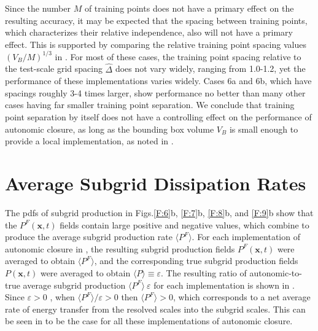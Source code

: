 Since the number $M$ of training points does not have a primary effect on the resulting accuracy, it may be expected that the spacing between training points, which characterizes their relative independence, also will not have a primary effect. This is supported by comparing the relative training point spacing values $(V_B/M)^{1/3}$ in . For most of these cases, the training point spacing relative to the test-scale grid spacing $\widehat{\Delta}$  does not vary widely, ranging from 1.0-1.2, yet the performance of these implementations varies widely. Cases 6a and 6b, which have spacings roughly 3-4 times larger, show performance no better than many other cases having far smaller training point separation. We conclude that training point separation by itself does not have a controlling effect on the performance of autonomic closure, as long as the bounding box volume  $V_B$ is small enough to provide a local implementation, as noted in .

\section{Average Subgrid Dissipation Rates}
\label{sec:IVF}

The pdfs of subgrid production in Figs.\ref{F:6}b, \ref{F:7}b, \ref{F:8}b, and \ref{F:9}b show that the $P^F(\mathbf{x},t)$  fields contain large positive and negative values, which combine to produce the average subgrid production rate $\langle P^F \rangle$. For each implementation of autonomic closure in , the resulting  subgrid production fields $P^F(\mathbf{x},t)$  were averaged to obtain $\langle P^F \rangle$, and the corresponding true subgrid production fields $P(\mathbf{x},t)$   were averaged to obtain $\langle P \rangle \equiv \varepsilon$. The resulting ratio of autonomic-to-true average subgrid production $\langle P^F \rangle\ \varepsilon$  for each implementation is shown in . Since $\varepsilon > 0$ , when  $\langle P^F\rangle/ \varepsilon > 0$  then $\langle P^F \rangle > 0$, which corresponds to a net average rate of energy transfer from the resolved scales into the subgrid scales.  This can be seen in  to be the case for all these implementations of autonomic closure. 



